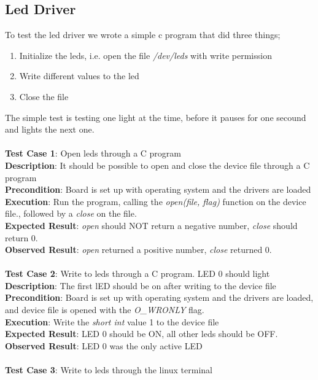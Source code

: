 \subsection{Led Driver}
To test the led driver we wrote a simple c program that did three things;
\begin{enumerate}
  \item Initialize the leds, i.e. open the file \textit{/dev/leds} with write permission
  \item Write different values to the led
  \item Close the file
\end{enumerate}
The simple test is testing one light at the time, before it pauses for one secound and 
lights the next one.\\
\\
{\bf Test Case 1}: Open leds through a C program \\
{\bf Description}: It should be possible to open and close the device file through a
C program \\
{\bf Precondition}: Board is set up with operating system and the drivers are loaded\\
{\bf Execution}: Run the program, calling the {\it open(file, flag)} function on the device
file., followed by a {\it close} on the file.\\
{\bf Expected Result}: {\it open} should NOT return a negative number, {\it close}
should return 0.\\
{\bf Observed Result}: {\it open} returned a positive number, {\it close}
returned 0. \\
 \\
{\bf Test Case 2}: Write to leds through a C program. LED 0 should light \\
{\bf Description}: The first lED should be on after writing to the device file \\
{\bf Precondition}: Board is set up with operating system and the drivers are loaded,
and device file is opened with the {\it O\_WRONLY} flag.\\
{\bf Execution}: Write the {\it short int} value 1 to the device file \\
{\bf Expected Result}: LED 0 should be ON, all other leds should be OFF. \\
{\bf Observed Result}: LED 0 was the only active LED \\
 \\
{\bf Test Case 3}: Write to leds through the linux terminal\\
